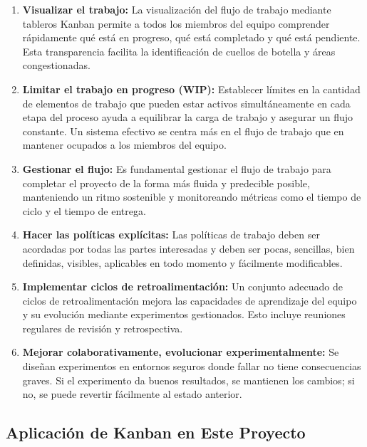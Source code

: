 \begin{enumerate}
    \item \textbf{Visualizar el trabajo:} La visualización del flujo de trabajo mediante tableros Kanban permite a todos los miembros del equipo comprender rápidamente qué está en progreso, qué está completado y qué está pendiente. Esta transparencia facilita la identificación de cuellos de botella y áreas congestionadas.
    
    \item \textbf{Limitar el trabajo en progreso (WIP):} Establecer límites en la cantidad de elementos de trabajo que pueden estar activos simultáneamente en cada etapa del proceso ayuda a equilibrar la carga de trabajo y asegurar un flujo constante. Un sistema efectivo se centra más en el flujo de trabajo que en mantener ocupados a los miembros del equipo.
    
    \item \textbf{Gestionar el flujo:} Es fundamental gestionar el flujo de trabajo para completar el proyecto de la forma más fluida y predecible posible, manteniendo un ritmo sostenible y monitoreando métricas como el tiempo de ciclo y el tiempo de entrega.
    
    \item \textbf{Hacer las políticas explícitas:} Las políticas de trabajo deben ser acordadas por todas las partes interesadas y deben ser pocas, sencillas, bien definidas, visibles, aplicables en todo momento y fácilmente modificables.
    
    \item \textbf{Implementar ciclos de retroalimentación:} Un conjunto adecuado de ciclos de retroalimentación mejora las capacidades de aprendizaje del equipo y su evolución mediante experimentos gestionados. Esto incluye reuniones regulares de revisión y retrospectiva.
    
    \item \textbf{Mejorar colaborativamente, evolucionar experimentalmente:} Se diseñan experimentos en entornos seguros donde fallar no tiene consecuencias graves. Si el experimento da buenos resultados, se mantienen los cambios; si no, se puede revertir fácilmente al estado anterior.
\end{enumerate}

\subsection{Aplicación de Kanban en Este Proyecto}

